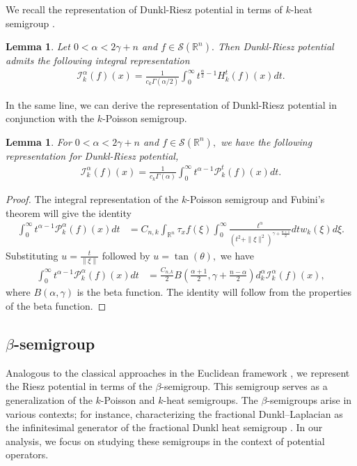 \documentclass[11pt,a4paper,reqno]{amsproc}
\newtheorem{lemma}[theorem]{Lemma}
\theoremstyle{definition}
\theoremstyle{remark}
\numberwithin{equation}{section}
\begin{document}
\noindent We recall the representation of Dunkl-Riesz potential in terms of $k$-heat semigroup \cite{Hassani}.


\begin{lemma} \label{Riesz-Heat}
    Let $0<\alpha< 2\gamma+n$ and $f\in \mathcal{S}(\mathbb{R}^n).$ Then Dunkl-Riesz potential admits the following integral representation
\begin{align} \label{Riesz-1}
    \mathcal{I}_k^{\alpha}(f)(x)= \frac{1}{c_k\Gamma(\alpha/2)} \int_0^{\infty} t^{\frac{\alpha}{2}-1} H_k^t(f)(x) dt.
\end{align}
\end{lemma}

\noindent In the same line, we can derive the representation of Dunkl-Riesz potential in conjunction with the $k$-Poisson semigroup.  
\begin{lemma}\label{Riesz-Poisson}
    For $0< \alpha< 2\gamma+n$ and $f \in \mathcal{S}(\mathbb{R}^n),$ we have the following representation for Dunkl-Riesz potential,
    \begin{align} \label{Riesz-2}
        \mathcal{I}_k^{\alpha}(f)(x)= \frac{1}{c_k\Gamma(\alpha)} \int_0^{\infty} t^{\alpha-1} \mathcal{P}_k^t(f)(x) dt.
    \end{align}
\end{lemma}
\begin{proof}
    The integral representation of the $k$-Poisson semigroup and Fubini's theorem will give the identity
    \begin{align*}
        \int_0^{\infty} t^{\alpha-1}\mathcal{P}_k^\alpha (f)(x) dt &= C_{n,k}\int_{\mathbb{R}^n}\tau_x f(\xi) \int_0^{\infty} \frac{t^\alpha}{(t^2+\|\xi\|^2)^{\gamma+\frac{n+1}{2}}} dt w_k(\xi)d\xi.
    \end{align*}Substituting $u=\frac{t}{\|\xi\|}$ followed by $u=\tan(\theta),$ we have
    \begin{align*}
         \int_0^{\infty} t^{\alpha-1}\mathcal{P}_k^\alpha (f)(x) dt &= \frac{C_{n,k}}{2} B\left(\frac{\alpha+1}{2}, \gamma+\frac{n-\alpha}{2}\right) d_{k}^\alpha \mathcal{I}_k^\alpha(f)(x), 
    \end{align*}  where $B(\alpha, \gamma)$ is the beta function.
    The identity will follow from the properties of the beta function.
\end{proof} 
\subsection{$\beta$-semigroup} 
Analogous to the classical approaches in the Euclidean framework \cite{Sezer}, we represent the Riesz potential in terms of the  $\beta$-semigroup.  This semigroup serves as a generalization of the $k$-Poisson and $k$-heat semigroups. The $\beta$-semigroups arise in various contexts; for instance, characterizing the fractional Dunkl–Laplacian as the infinitesimal generator of the fractional Dunkl heat semigroup \cite{Rejeb}. In our analysis, we focus on studying these semigroups in the context of potential operators.
\end{document}
